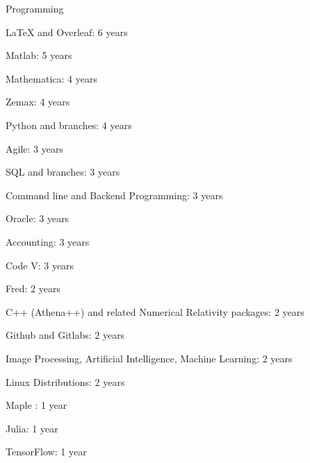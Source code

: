 \begin{cventries}
  \cventry
    {}
    {Programming}
    {}
    {}
    {
      \begin{cvitems}
        \item {LaTeX and Overleaf: 6 years}
        \item {Matlab: 5 years }
        \item {Mathematica: 4 years }
        \item {Zemax: 4 years}
        \item {Python and branches: 4 years }
        \item {Agile: 3 years}
        \item {SQL and branches: 3 years }
        \item{Command line and Backend Programming: 3 years}
        \item {Oracle: 3 years}
        \item{Accounting: 3 years}
        \item {Code V: 3 years}
        \item {Fred: 2 years}
        \item{C++ (Athena++) and related Numerical Relativity packages: 2 years}
        \item{Github and Gitlabs: 2 years}
        \item{Image Processing, Artificial Intelligence, Machine Learning: 2 years}
        \item {Linux Distributions: 2 years}
        \item {Maple : 1 year}
        \item{Julia: 1 year}
        \item{TensorFlow: 1 year}
        
      \end{cvitems}
    }


\end{cventries}
